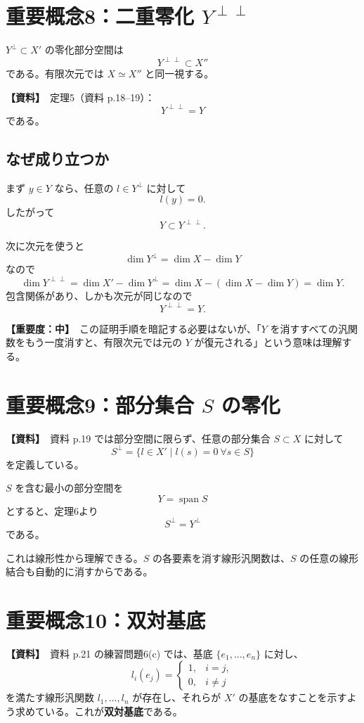 \documentclass[a4paper,11pt]{ltjsarticle}
\newcommand{\Span}{\operatorname{span}}
\newcommand{\sourceitem}{\textbf{【資料】}}
\newcommand{\midimportance}{\textbf{【重要度：中】}}
\begin{document}
\section{重要概念8：二重零化 $Y^{\perp\perp}$}

$Y^\perp\subset X'$ の零化部分空間は
\[
Y^{\perp\perp}\subset X''
\]
である。有限次元では $X\simeq X''$ と同一視する。

\sourceitem\ 定理5（資料 p.18--19）：
\[
\boxed{Y^{\perp\perp}=Y}
\]
である。

\subsection{なぜ成り立つか}
まず $y\in Y$ なら、任意の $l\in Y^\perp$ に対して
\[
l(y)=0.
\]
したがって
\[
Y\subset Y^{\perp\perp}.
\]

次に次元を使うと
\[
\dim Y^\perp=\dim X-\dim Y
\]
なので
\[
\dim Y^{\perp\perp}
=\dim X'-\dim Y^\perp
=\dim X-(\dim X-\dim Y)
=\dim Y.
\]
包含関係があり、しかも次元が同じなので
\[
Y^{\perp\perp}=Y.
\]

\midimportance\ この証明手順を暗記する必要はないが、「$Y$ を消すすべての汎関数をもう一度消すと、有限次元では元の $Y$ が復元される」という意味は理解する。

\section{重要概念9：部分集合 $S$ の零化}

\sourceitem\ 資料 p.19 では部分空間に限らず、任意の部分集合 $S\subset X$ に対して
\[
S^\perp
=
\{l\in X'\mid l(s)=0\ \forall s\in S\}
\]
を定義している。

$S$ を含む最小の部分空間を
\[
Y=\Span S
\]
とすると、定理6より
\[
\boxed{S^\perp=Y^\perp}
\]
である。

これは線形性から理解できる。$S$ の各要素を消す線形汎関数は、$S$ の任意の線形結合も自動的に消すからである。

\section{重要概念10：双対基底}

\sourceitem\ 資料 p.21 の練習問題6(c) では、基底 $\{e_1,\dots,e_n\}$ に対し、
\[
 l_i(e_j)=
 \begin{cases}
 1,&i=j,\\
 0,&i\ne j
 \end{cases}
\]
を満たす線形汎関数 $l_1,\dots,l_n$ が存在し、それらが $X'$ の基底をなすことを示すよう求めている。これが\textbf{双対基底}である。
\end{document}
